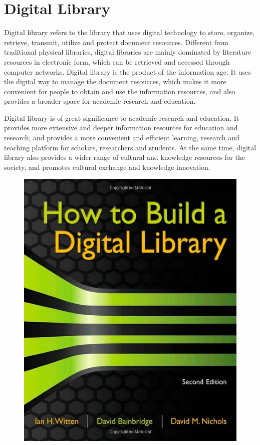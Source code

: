 \section{Digital Library}
Digital library refers to the library that uses digital technology to store, organize, retrieve, transmit, utilize and protect document resources. Different from traditional physical libraries, digital libraries are mainly dominated by literature resources in electronic form, which can be retrieved and accessed through computer networks. Digital library is the product of the information age. It uses the digital way to manage the document resources, which makes it more convenient for people to obtain and use the information resources, and also provides a broader space for academic research and education.

Digital library is of great significance to academic research and education. It provides more extensive and deeper information resources for education and research, and provides a more convenient and efficient learning, research and teaching platform for scholars, researchers and students. At the same time, digital library also provides a wider range of cultural and knowledge resources for the society, and promotes cultural exchange and knowledge innovation.

\begin{figure}[htbp]
  \centerline{\includegraphics[width=500pt]{images/HowtoBuildDigitalLibrary.jpg}}
\end{figure}

